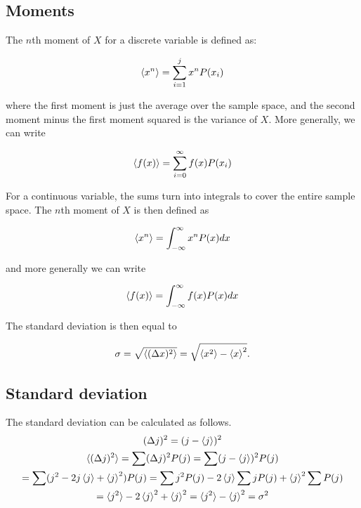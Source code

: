 \documentclass{article}
\numberwithin{theorem}{subsection}
\numberwithin{theorem}{subsubsection}
\numberwithin{lemma}{subsection}
\numberwithin{lemma}{subsubsection}
\theoremstyle{definition}
\numberwithin{definition}{subsection}
\numberwithin{definition}{subsubsection}
\begin{document}
\subsection{Moments}
The $n$th moment of $X$ for a discrete variable is defined as:

\begin{gather*}
    \braket{x^n} = \sum_{i=1}^{j}x^{n}P(x_{i})
\end{gather*}

\noindent where the first moment is just the average over the sample space, and the second moment minus the first moment squared is the variance of $X$. More generally, we can write

\begin{gather*}
    \braket{f(x)} = \sum_{i=0}^{\infty} f(x) P(x_{i})
\end{gather*}

\indent For a continuous variable, the sums turn into integrals to cover the entire sample space. The $n$th moment of $X$ is then defined as

\begin{gather*}
    \braket{x^n} = \int_{-\infty}^{\infty} x^n P(x) dx
\end{gather*}

\noindent and more generally we can write

\begin{gather*}
    \braket{f(x)} = \int_{-\infty}^{\infty} f(x) P(x) dx
\end{gather*}

\indent The standard deviation is then equal to

\begin{gather*}
    \sigma = \sqrt{\braket{(\Delta x)^{2}}} = \sqrt{\braket{x^2} - \braket{x}^2}. 
\end{gather*}

\subsection{Standard deviation}

The standard deviation can be calculated as follows.
\begin{gather*}
    (\Delta j)^2 = (j - \braket{j})^2 \\
    \braket{(\Delta j)^{2}} = \sum (\Delta j)^2 P(j) = \sum (j-\braket{j})^2 P(j) \\
    = \sum (j^2 - 2j\braket{j} + \braket{j}^2) P(j) = \sum j^2 P(j) - 2\braket{j}\sum j P(j) + \braket{j}^2 \sum P(j) \\
    = \braket{j^2} - 2\braket{j}^2 + \braket{j}^2 = \braket{j^2} - \braket{j}^2 = \sigma^{2}
\end{gather*}
\end{document}
